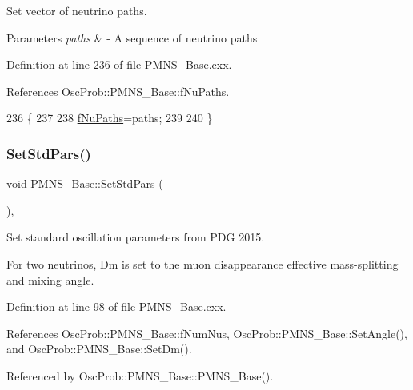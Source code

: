 Set vector of neutrino paths. 
\begin{DoxyParams}{Parameters}
{\em paths} & -\/ A sequence of neutrino paths \\
\hline
\end{DoxyParams}


Definition at line 236 of file P\+M\+N\+S\+\_\+\+Base.\+cxx.



References Osc\+Prob\+::\+P\+M\+N\+S\+\_\+\+Base\+::f\+Nu\+Paths.


\begin{DoxyCode}
236                                               \{
237 
238   \hyperlink{classOscProb_1_1PMNS__Base_a69db9d57e12fc7cbe0431bc6c18fac93}{fNuPaths}=paths;
239 
240 \}
\end{DoxyCode}
\mbox{\label{classOscProb_1_1PMNS__Base_a4de96ac9b6d1e9b029ab877e57d211ad}} 
\subsubsection{\texorpdfstring{Set\+Std\+Pars()}{SetStdPars()}}
{\footnotesize\ttfamily void P\+M\+N\+S\+\_\+\+Base\+::\+Set\+Std\+Pars (\begin{DoxyParamCaption}{ }\end{DoxyParamCaption})\hspace{0.3cm}{\ttfamily [virtual]}, {\ttfamily [inherited]}}

Set standard oscillation parameters from P\+DG 2015.

For two neutrinos, Dm is set to the muon disappearance effective mass-\/splitting and mixing angle. 

Definition at line 98 of file P\+M\+N\+S\+\_\+\+Base.\+cxx.



References Osc\+Prob\+::\+P\+M\+N\+S\+\_\+\+Base\+::f\+Num\+Nus, Osc\+Prob\+::\+P\+M\+N\+S\+\_\+\+Base\+::\+Set\+Angle(), and Osc\+Prob\+::\+P\+M\+N\+S\+\_\+\+Base\+::\+Set\+Dm().



Referenced by Osc\+Prob\+::\+P\+M\+N\+S\+\_\+\+Base\+::\+P\+M\+N\+S\+\_\+\+Base().


